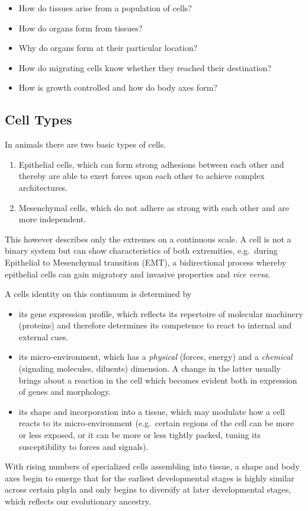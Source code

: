\documentclass[11pt,singlespacinge,twoside]{reedthesis} %
\providecommand{\tightlist}{%
  \setlength{\itemsep}{0pt}\setlength{\parskip}{0pt}}
\theoremstyle{definition}
\theoremstyle{definition}
\theoremstyle{definition}
\theoremstyle{remark}
\begin{document}
\begin{itemize}
\tightlist
\item
  How do tissues arise from a population of cells?
\item
  How do organs form from tissues?
\item
  Why do organs form at their particular location?
\item
  How do migrating cells know whether they reached their destination?
\item
  How is growth controlled and how do body axes form?
\end{itemize}
\hypertarget{intro-types}{%
\subsection{Cell Types}\label{intro-types}}

In animals there are two basic types of cells.
\begin{enumerate}
\def\labelenumi{\arabic{enumi}.}
\tightlist
\item
  Epithelial cells, which can form strong adhesions between each other and thereby are able to exert forces upon each other to achieve complex architectures.
\item
  Mesenchymal cells, which do not adhere as strong with each other and are more independent.
\end{enumerate}
This however describes only the extremes on a continuous scale. A cell is not a binary system but can show characteristics of both extremities, e.g.~during Epithelial to Mesenchymal transition (EMT), a bidirectional process whereby epithelial cells can gain migratory and invasive properties and \emph{vice versa}.

A cells identity on this continuum is determined by
\begin{itemize}
\tightlist
\item
  its gene expression profile, which reflects its repertoire of molecular machinery (proteins) and therefore determines its competence to react to internal and external cues.
\item
  its micro-environment, which has a \emph{physical} (forces, energy) and a \emph{chemical} (signaling molecules, diluents) dimension. A change in the latter usually brings about a reaction in the cell which becomes evident both in expression of genes and morphology.
\item
  its shape and incorporation into a tissue, which may modulate how a cell reacts to its micro-environment (e.g.~certain regions of the cell can be more or less exposed, or it can be more or less tightly packed, tuning its susceptibility to forces and signals).
\end{itemize}
With rising numbers of specialized cells assembling into tissue, a shape and body axes begin to emerge that for the earliest developmental stages is highly similar across certain phyla and only begins to diversify at later developmental stages, which reflects our evolutionary ancestry.
\end{document}
